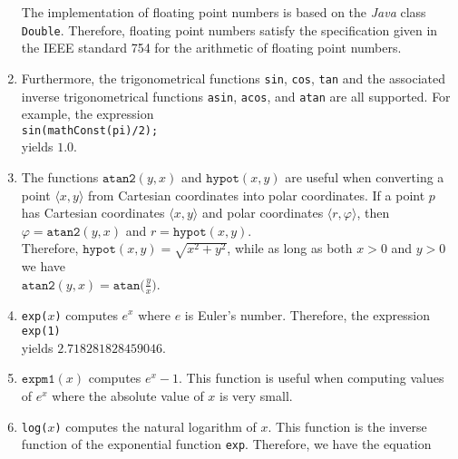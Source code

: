 \begin{enumerate}
      The implementation of floating point numbers is based on the \textsl{Java} class
      \texttt{Double}.  Therefore, floating point numbers satisfy the specification given in the
      IEEE standard 754 for the arithmetic of floating point numbers.
\item Furthermore, the trigonometrical functions \texttt{sin}, \texttt{cos}, \texttt{tan}
      and the associated inverse trigonometrical functions 
      \texttt{asin}, 
      \texttt{acos}, and 
      \texttt{atan}
      are all supported.  For example, the expression
      \\[0.2cm]
      \hspace*{1.3cm}
      \texttt{sin(mathConst(pi)/2);}
      \\[0.2cm]
      yields $1.0$.
\item The functions $\texttt{atan2}(y,x)$ and $\texttt{hypot}(x,y)$ are useful when converting 
      a point $\langle x, y \rangle$ from Cartesian coordinates into polar coordinates.  If a
      point $p$ has Cartesian coordinates $\langle x, y \rangle$ and polar coordinates 
      $\langle r, \varphi \rangle$, then 
      \\[0.2cm]
      \hspace*{1.3cm}
      $\varphi = \mathtt{atan2}(y,x)$ \quad and \quad $r = \mathtt{hypot}(x, y)$.
      \\[0.2cm]
      Therefore, $\texttt{hypot}(x,y) = \sqrt{x^2 + y^2}$, while as long as both $x > 0$ and $y > 0$
      we have
      \\[0.2cm]
      \hspace*{1.3cm}
      $\mathtt{atan2}(y,x) = \mathtt{atan}\bigl(\frac{y}{x}\bigr)$.
\item \texttt{exp($x$)} computes $e^x$ where $e$ is Euler's number.  Therefore, the
      expression 
      \\[0.2cm]
      \hspace*{1.3cm}
      \texttt{exp(1)}
      \\[0.2cm]
      yields $2.718281828459046$.
\item $\texttt{expm1}(x)$ computes $e^x - 1$.  This function is useful when computing values of
      $e^x$ where the absolute value of $x$ is very small.
\item \texttt{log($x$)} computes the natural logarithm of $x$.  This function is the
      inverse function of the exponential function \texttt{exp}.  Therefore, we have
      the equation
      \\[0.2cm]
      \hspace*{1.3cm}

\end{enumerate}
